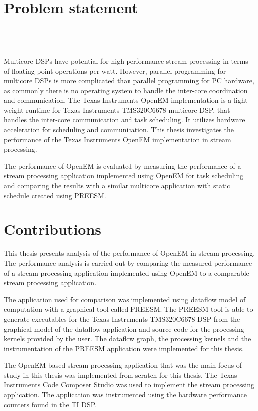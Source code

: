 \section{Problem statement}
\label{section:problem-statement}
 \\
 \\
 \\
Multicore DSPs have potential for high performance stream processing in terms of floating point operations per watt. However, parallel programming for multicore DSPs is more complicated than parallel programming for PC hardware, as commonly there is no operating system to handle the inter-core coordination and communication. The Texas Instruments OpenEM implementation is a light-weight runtime for Texas Instruments TMS320C6678 multicore DSP, that handles the inter-core communication and task scheduling. It utilizes hardware acceleration for scheduling and communication. This thesis investigates the performance of the Texas Instruments OpenEM implementation in stream processing.

The performance of OpenEM is evaluated by measuring the performance of a stream processing application implemented using OpenEM for task scheduling and comparing the results with a similar multicore application with static schedule created using PREESM.

\section{Contributions}
\label{section:contributions}
This thesis presents analysis of the performance of OpenEM in stream processing. The performance analysis is carried out by comparing the measured performance of a stream processing application implemented using OpenEM to a comparable stream processing application.

The application used for comparison was implemented using dataflow model of computation with a graphical tool called PREESM. The PREESM tool is able to generate executables for the Texas Instruments TMS320C6678 DSP from the graphical model of the dataflow application and source code for the processing kernels provided by the user. The dataflow graph, the processing kernels and the instrumentation of the PREESM application were implemented for this thesis.

The OpenEM based stream processing application that was the main focus of study in this thesis was implemented from scratch for this thesis. The Texas Instruments Code Composer Studio was used to implement the stream processing application. The application was instrumented using the hardware performance counters found in the TI DSP.


